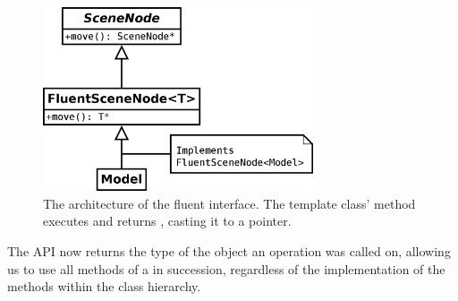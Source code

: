 			\begin{figure}[htbp]
				\centering
				\includegraphics[width=8cm]{images/FluentInterface.png}
				\caption{The architecture of the fluent interface. The template class' method  executes  and returns , casting it to a  pointer.}
				\label{fig:FluentInterface}
			\end{figure}

			The API now returns the type of the object an operation was called on, allowing us to use all methods of a  in succession, regardless of the implementation of the methods within the class hierarchy.

